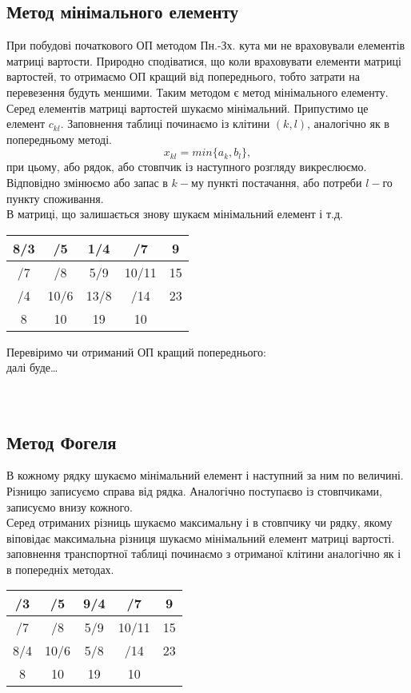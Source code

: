 \documentclass[12pt,a4paper]{book}
\begin{document}
\subsection{Метод мінімального елементу}
При побудові початкового ОП методом Пн.-Зх. кута ми не враховували елементів матриці вартости. Природно сподіватися, що коли враховувати елементи матриці вартостей, то отримаємо ОП кращий від попереднього, тобто затрати на перевезення будуть меншими. Таким методом є метод мінімального елементу.\\
Серед елементів матриці вартостей шукаємо мінімальний. Припустимо це елемент $c_{kl}$. Заповнення таблиці починаємо із клітини $(k,l)$, аналогічно як в попередньому методі.
$$x_{kl} = min\{a_k,b_l\},$$
при цьому, або рядок, або стовпчик із наступного розгляду викреслюємо. Відповідно змінюємо або запас в $k-$му пункті постачання, або потреби $l-$го пункту споживання.\\
В матриці, що залишається знову шукаєм мінімальний елемент і т.д.\\
\begin{tabular}{ | c | c | c | c | c |}
\hline
8/3	&	/5	&	1/4	&	/7		&	9\\
\hline
/7	&	/8	&	5/9	&	10/11	&	15\\
\hline
/4	&	10/6	&	13/8	&	/14		&	23\\
\hline
8	&	10	&	19	&	10		&\\
\hline
\end{tabular}
Перевіримо чи отриманий ОП кращий попереднього:\\
далі буде\dots\\
\\
\\
\subsection{Метод Фогеля}
В кожному рядку шукаємо мінімальний елемент і наступний за ним по величині. Різницю записуємо справа від рядка. Аналогічно поступаєво із стовпчиками, записуємо внизу кожного.\\
Серед отриманих різниць шукаємо максимальну і в стовпчику чи рядку, якому віповідає максимальна різниця шукаємо мінімальний елемент матриці вартості.\\
заповнення транспортної таблиці починаємо з отриманої клітини аналогічно як і в попередніх методах.\\
\begin{tabular}{ | c | c | c | c | c |}
\hline
/3	&	/5	&	9/4	&	/7		&	9\\
\hline
/7	&	/8	&	5/9	&	10/11	&	15\\
\hline
8/4	&	10/6	&	5/8	&	/14		&	23\\
\hline
8	&	10	&	19	&	10		&\\
\hline
\end{tabular}
\end{document}
